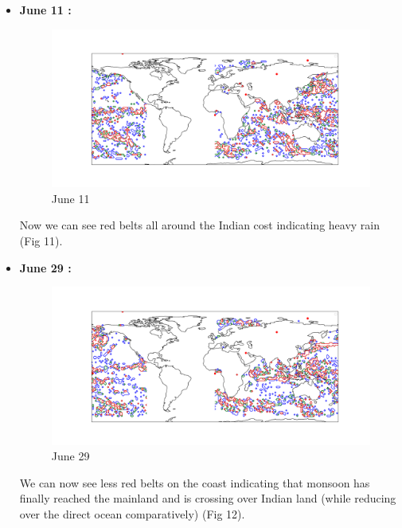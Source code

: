 \documentclass[conference]{IEEEtran}
\begin{document}
\begin{enumerate}
\begin{itemize}
    \item \textbf{June 11 :} 
    
    \begin{figure}
        \centering
        \includegraphics[width=1\linewidth]{Jun11.png}
        \caption{June 11}
        \label{fig:enter-label}
    \end{figure}
    
    Now we can see red belts all around the Indian cost indicating heavy rain (Fig 11).

    \item \textbf{June 29 :} 
    
    \begin{figure}
        \centering
        \includegraphics[width=1\linewidth]{Jun29.png}
        \caption{June 29}
        \label{fig:enter-label}
    \end{figure}
    
    We can now see less red belts on the coast indicating that monsoon has finally reached the mainland and is crossing over Indian land (while reducing over the direct ocean comparatively) (Fig 12).\\

    \end{itemize}
 



\end{enumerate}
\end{document}
